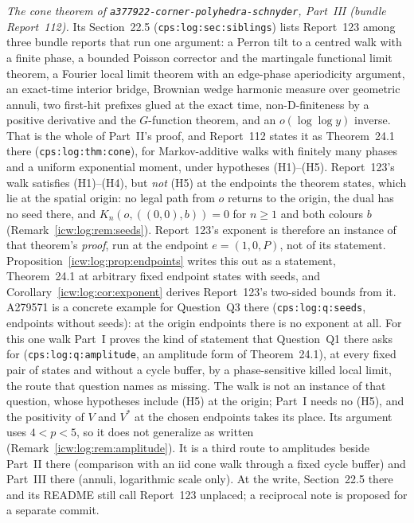 \documentclass[11pt,letterpaper]{article}
\theoremstyle{remark}\newtheorem{remark}[theorem]{Remark}
\newcommand{\1}{\mathbf1}
\newcommand{\file}[1]{\textup{\nolinkurl{#1}}}
\begin{document}
\emph{The cone theorem of \file{a377922-corner-polyhedra-schnyder}, Part~III (bundle Report~112).} Its Section~22.5 (\texttt{cps:log:sec:siblings}) lists Report~123 among three bundle reports that run one argument: a Perron tilt to a centred walk with a finite phase, a bounded Poisson corrector and the martingale functional limit theorem, a Fourier local limit theorem with an edge-phase aperiodicity argument, an exact-time interior bridge, Brownian wedge harmonic measure over geometric annuli, two first-hit prefixes glued at the exact time, non-D-finiteness by a positive derivative and the $G$-function theorem, and an $o(\log\log y)$ inverse. That is the whole of Part~II's proof, and Report~112 states it as Theorem~24.1 there (\texttt{cps:log:thm:cone}), for Markov-additive walks with finitely many phases and a uniform exponential moment, under hypotheses (H1)--(H5). Report~123's walk satisfies (H1)--(H4), but \emph{not} (H5) at the endpoints the theorem states, which lie at the spatial origin: no legal path from $o$ returns to the origin, the dual has no seed there, and $K_n(o,((0,0),b))=0$ for $n\ge1$ and both colours $b$ (Remark~\ref{icw:log:rem:seeds}). Report~123's exponent is therefore an instance of that theorem's \emph{proof}, run at the endpoint $e=(1,0,P)$, not of its statement. Proposition~\ref{icw:log:prop:endpoints} writes this out as a statement, Theorem~24.1 at arbitrary fixed endpoint states with seeds, and Corollary~\ref{icw:log:cor:exponent} derives Report~123's two-sided bounds from it. A279571 is a concrete example for Question~Q3 there (\texttt{cps:log:q:seeds}, endpoints without seeds): at the origin endpoints there is no exponent at all. For this one walk Part~I proves the kind of statement that Question~Q1 there asks for (\texttt{cps:log:q:amplitude}, an amplitude form of Theorem~24.1), at every fixed pair of states and without a cycle buffer, by a phase-sensitive killed local limit, the route that question names as missing. The walk is not an instance of that question, whose hypotheses include (H5) at the origin; Part~I needs no (H5), and the positivity of $V$ and $V^*$ at the chosen endpoints takes its place. Its argument uses $4<p<5$, so it does not generalize as written (Remark~\ref{icw:log:rem:amplitude}). It is a third route to amplitudes beside Part~II there (comparison with an iid cone walk through a fixed cycle buffer) and Part~III there (annuli, logarithmic scale only). At the write, Section~22.5 there and its README still call Report~123 unplaced; a reciprocal note is proposed for a separate commit.
\end{document}
